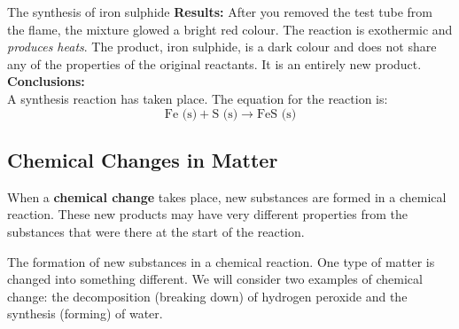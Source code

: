 \begin{g_experiment}{The synthesis of iron sulphide }
      \label{m38709*id63554}\noindent{}\textbf{Results:} 
After you removed the test tube from the flame, the mixture glowed a bright red colour. The reaction is exothermic and \textsl{produces heats}. The product, iron sulphide, is a dark colour and does not share any of the properties of the original reactants. It is an entirely new product.\\
        \label{m38709*id63594}\noindent{}\textbf{Conclusions:} \\
A synthesis reaction has taken place. The equation for the reaction is:
        \label{m38709*id63604}\nopagebreak\noindent{}
    \begin{equation*}
    \text{Fe (s)}+\text{S (s)}\to \text{FeS (s)}
      \end{equation*} 
\end{g_experiment}
    \label{m38709*cid3}
            \subsection*{Chemical Changes in Matter}
            \nopagebreak
      \label{m38709*id62778}When a \textbf{chemical change} takes place, new substances are formed in a chemical reaction. These new products may have very different properties from the substances that were there at the start of the reaction.\par 
{}
            \label{m38709*fhsst!!!underscore!!!id107}
  {  The formation of new substances in a chemical reaction. One type of matter is changed into something different.  } 
We will consider two examples of chemical change: the decomposition (breaking down) of hydrogen peroxide and the synthesis (forming) of water. \\
